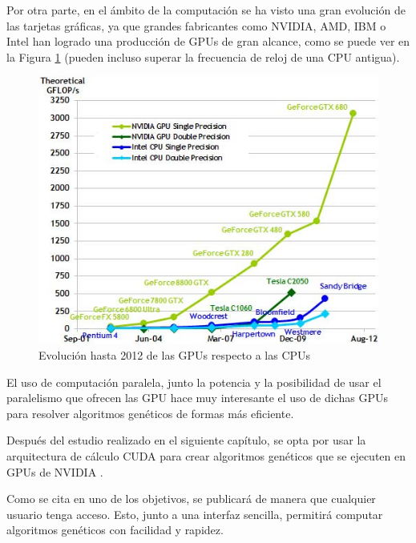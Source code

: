 Por otra parte, en el ámbito de la computación se ha visto una gran evolución de las tarjetas gráficas, ya que grandes fabricantes como NVIDIA, AMD, IBM o Intel han logrado una producción de GPUs de gran alcance, como se puede ver en la Figura \ref{fig:gpu_vs_cpu} (pueden incluso superar la frecuencia de reloj de una CPU antigua).

\bigskip
\begin{figure}[h]
	\centering
	\includegraphics[width=0.7\linewidth]{../images/gpu_vs_cpu}
	\caption[Evolución de las GPUs respecto a las CPUs]{Evolución hasta 2012 de las GPUs respecto a las CPUs}
	\label{fig:gpu_vs_cpu}
\end{figure}


\bigskip
El uso de computación paralela, junto la potencia y la posibilidad de usar el paralelismo que ofrecen las GPU  hace muy interesante el uso de dichas GPUs para resolver algoritmos genéticos de formas más eficiente.

Después del estudio realizado en el siguiente capítulo, se opta por usar la arquitectura de cálculo CUDA \cite{nvidiacuda} para crear algoritmos genéticos que se ejecuten en GPUs de NVIDIA \cite{nvidiadeveloper}.

Como se cita en uno de los objetivos, se publicará de manera que cualquier usuario tenga acceso. Esto, junto a una interfaz sencilla, permitirá computar algoritmos genéticos con facilidad y rapidez.




